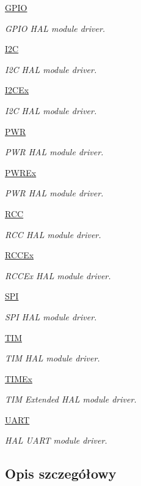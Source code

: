 \begin{DoxyCompactItemize}
\hyperlink{group___g_p_i_o}{G\+P\+IO}
\begin{DoxyCompactList}\small\item\em G\+P\+IO H\+AL module driver. \end{DoxyCompactList}\item 
\hyperlink{group___i2_c}{I2C}
\begin{DoxyCompactList}\small\item\em I2C H\+AL module driver. \end{DoxyCompactList}\item 
\hyperlink{group___i2_c_ex}{I2\+C\+Ex}
\begin{DoxyCompactList}\small\item\em I2C H\+AL module driver. \end{DoxyCompactList}\item 
\hyperlink{group___p_w_r}{P\+WR}
\begin{DoxyCompactList}\small\item\em P\+WR H\+AL module driver. \end{DoxyCompactList}\item 
\hyperlink{group___p_w_r_ex}{P\+W\+R\+Ex}
\begin{DoxyCompactList}\small\item\em P\+WR H\+AL module driver. \end{DoxyCompactList}\item 
\hyperlink{group___r_c_c}{R\+CC}
\begin{DoxyCompactList}\small\item\em R\+CC H\+AL module driver. \end{DoxyCompactList}\item 
\hyperlink{group___r_c_c_ex}{R\+C\+C\+Ex}
\begin{DoxyCompactList}\small\item\em R\+C\+C\+Ex H\+AL module driver. \end{DoxyCompactList}\item 
\hyperlink{group___s_p_i}{S\+PI}
\begin{DoxyCompactList}\small\item\em S\+PI H\+AL module driver. \end{DoxyCompactList}\item 
\hyperlink{group___t_i_m}{T\+IM}
\begin{DoxyCompactList}\small\item\em T\+IM H\+AL module driver. \end{DoxyCompactList}\item 
\hyperlink{group___t_i_m_ex}{T\+I\+M\+Ex}
\begin{DoxyCompactList}\small\item\em T\+IM Extended H\+AL module driver. \end{DoxyCompactList}\item 
\hyperlink{group___u_a_r_t}{U\+A\+RT}
\begin{DoxyCompactList}\small\item\em H\+AL U\+A\+RT module driver. \end{DoxyCompactList}\end{DoxyCompactItemize}


\subsection{Opis szczegółowy}
